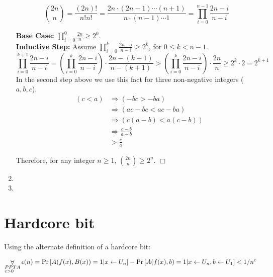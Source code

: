 \documentclass[12pt]{article}
\def\Forall{\mathop{\rm {\forall}}}
\begin{document}
\begin{enumerate}
\begin{displaymath}
\binom{2n}{n} = \frac{(2n)!}{n!n!}= \frac{2n\cdot(2n-1)\cdots (n+1)}{n\cdot(n-1)\cdots 1} = \prod_{i=0}^{n-1} \frac{2n-i}{n-i}
\end{displaymath}

\textbf{Base Case:} $\prod_{i=0}^{0} \frac{2n}{n} \ge 2^0$.\\
\textbf{Inductive Step:} Assume $\prod_{i=0}^k \frac{2n-i}{n-i} \ge 2^k$,
for $0 \le k < n-1$.
%
\begin{displaymath}
\prod_{i=0}^{k+1} \frac{2n-i}{n-i} = (\prod_{i=0}^{k} \frac{2n-i}{n-i})\cdot \frac{2n-(k+1)}{n-(k+1)} > (\prod_{i=0}^{k} \frac{2n-i}{n-i})\cdot \frac{2n}{n}
 \ge 2^k \cdot 2 = 2^{k+1}
\end{displaymath}
%
In the second step above we use this fact for
three non-negative integers ($a,b,c$).
%
\begin{eqnarray*}
& (c < a) & \Rightarrow (-bc > -ba)\\
&         & \Rightarrow (ac - bc < ac - ba)\\
&         & \Rightarrow (c(a-b) < a(c-b))\\
&         & \Rightarrow \frac{c-b}{a-b}\\
&         & > \frac{c}{a}
\end{eqnarray*}

Therefore, for any integer $n \ge 1$, $\binom{2n}{n} \ge 2^n$.
$\Box$
\item %
\item %
\end{enumerate}

\pagebreak

\section{Hardcore bit}

Using the alternate definition of a hardcore bit:

\begin{displaymath}
\Forall_{\begin{subarray}{l} PPT A\\
c>0 \end{subarray}} \epsilon(n) = \Pr\left[A(f(x), B(x))=1 | x \gets U_n\right] -
\Pr\left[A(f(x), b) = 1 | x \gets U_n, b \gets U_1\right] < 1/n^c
\end{displaymath}
\end{document}

